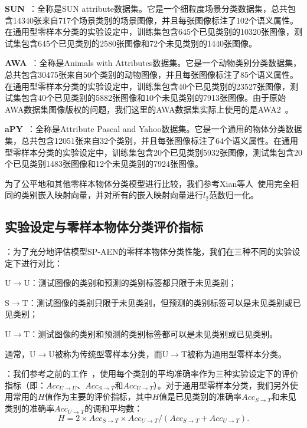 \textbf{SUN}~\cite{patterson2012sun}：全称是SUN attribute数据集。它是一个细粒度场景分类数据集，总共包含14340张来自717个场景类别的场景图像，并且每张图像标注了102个语义属性。在通用型零样本分类的实验设定中，训练集包含645个已见类别的10320张图像，测试集包含645个已见类别的2580张图像和72个未见类别的1440张图像。

\textbf{AWA}~\cite{lampert2009learning}：全称是Animals with Attributes数据集。它是一个动物类别分类数据集，总共包含30475张来自50个类别的动物图像，并且每张图像标注了85个语义属性。在通用型零样本分类的实验设定中，训练集包含40个已见类别的23527张图像，测试集包含40个已见类别的5882张图像和10个未见类别的7913张图像。由于原始AWA数据集图像版权的问题，我们这里的AWA数据集实际上使用的是AWA2~\cite{xian2017zero,xian2018zero}。

\textbf{aPY}~\cite{farhadi2009describing}：全称是Attribute Pascal and Yahoo数据集。它是一个通用的物体分类数据集，总共包含12051张来自32个类别，并且每张图像标注了64个语义属性。在通用型零样本分类的实验设定中，训练集包含20个已见类别5932张图像，测试集包含20个已见类别1483张图像和12个未见类别的7924张图像。

为了公平地和其他零样本物体分类模型进行比较，我们参考Xian等人~\cite{xian2017zero}使用完全相同的类别嵌入映射向量，并对所有的嵌入映射向量进行$l_2$范数归一化。


\subsection{实验设定与零样本物体分类评价指标}
\textbf{}：为了充分地评估模型SP-AEN的零样本物体分类性能，我们在三种不同的实验设定下进行对比：
\begin{asparaenum}
\item U$\to$U：测试图像的类别和预测的类别标签都只限于未见类别；

\item S$\to$T：测试图像的类别只限于未见类别，但预测的类别标签可以是未见类别或已见类别；

\item U$\to$T：测试图像的类别和预测的类别标签都可以是未见类别或已见类别。
\end{asparaenum}
通常，U$\to$U被称为传统型零样本分类，而U$\to$T被称为通用型零样本分类。

\textbf{}：我们参考之前的工作~\cite{xian2017zero}，使用每个类别的平均准确率作为三种实验设定下的评价指标（即：$Acc_{U\rightarrow U}$、$Acc_{S\rightarrow T}$和$Acc_{U\rightarrow T}$）。对于通用型零样本分类，我们另外使用常用的$H$值作为主要的评价指标，其中$H$值是已见类别的准确率$Acc_{S\rightarrow T}$和未见类别的准确率$Acc_{U\rightarrow T}$的调和平均数：
\begin{equation} \label{ch3:eq:eq_7}
H = 2\times Acc_{S\rightarrow T}\times Acc_{U\rightarrow T} /(Acc_{S\rightarrow T}+Acc_{U\rightarrow T}).
\end{equation}

